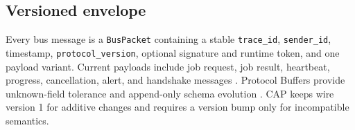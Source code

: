 \subsection{Versioned envelope}

Every bus message is a \texttt{BusPacket} containing a stable \texttt{trace\_id}, \texttt{sender\_id}, timestamp, \texttt{protocol\_version}, optional signature and runtime token, and one payload variant. Current payloads include job request, job result, heartbeat, progress, cancellation, alert, and handshake messages \citep{cap_current}. Protocol Buffers provide unknown-field tolerance and append-only schema evolution \citep{protobuf}. CAP keeps wire version 1 for additive changes and requires a version bump only for incompatible semantics.
